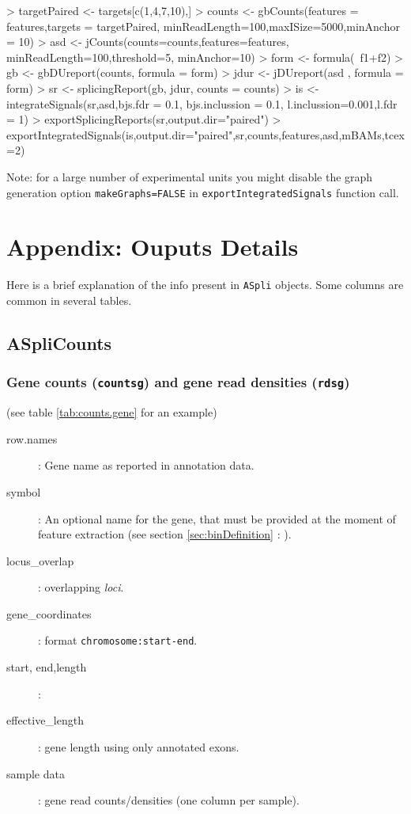 \documentclass{article}
\newcommand{\secref}[1]{\ref{#1} : \nameref{#1}}
\begin{document}
\begin{Schunk}
\begin{Sinput}
> targetPaired <- targets[c(1,4,7,10),]
> counts <- gbCounts(features = features,targets = targetPaired,
                    minReadLength=100,maxISize=5000,minAnchor = 10)
> asd    <- jCounts(counts=counts,features=features,
                    minReadLength=100,threshold=5, minAnchor=10)
> form   <- formula(~f1+f2)
> gb     <- gbDUreport(counts, formula = form)
> jdur   <- jDUreport(asd    , formula = form)
> sr <- splicingReport(gb, jdur, counts = counts)
> is <- integrateSignals(sr,asd,bjs.fdr = 0.1, bjs.inclussion = 0.1, l.inclussion=0.001,l.fdr = 1)
> exportSplicingReports(sr,output.dir="paired")
> exportIntegratedSignals(is,output.dir="paired",sr,counts,features,asd,mBAMs,tcex=2)
\end{Sinput}
\end{Schunk}

Note: for a large number of experimental units you might disable the graph generation option \texttt{makeGraphs=FALSE} in \texttt{exportIntegratedSignals} function call.


\section{Appendix: Ouputs Details}
Here is a brief explanation of the info  present in \texttt{ASpli} objects. Some columns are common in several tables.
\label{sec:outputs}

\subsection*{ASpliCounts}

\subsubsection*{Gene counts (\texttt{countsg}) and gene read densities (\texttt {rdsg}) }
(see table  \ref{tab:counts.gene} for an example)

\begin{description}
      \item[row.names]: Gene name as reported in annotation data.
      \item[symbol]: An optional name for the gene, that must be provided at the moment of feature extraction (see section
      \secref{sec:binDefinition}).
      \item[locus\_overlap]: overlapping \textit{loci}.
      \item[gene\_coordinates]: format \texttt{chromosome:start-end}.
      \item[start, end,length]: 
      \item[effective\_length]: gene length using only annotated exons.
      \item[sample data]: gene read counts/densities  (one column per sample).
      \end{description} 
\end{document}
